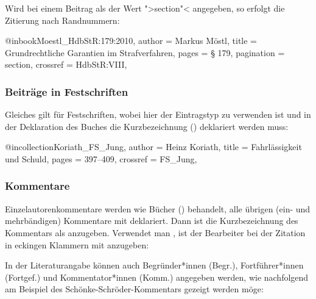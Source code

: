 \documentclass{ltxdockit}[2010/09/26]
\begin{document}
Wird bei einem Beitrag als  der Wert ">section"< angegeben, so erfolgt die Zitierung nach Randnummern:

\begin{ltxcode}
@inbook{Moestl_HdbStR:179:2010,
author = {Markus Möstl},
title = {Grundrechtliche Garantien im Strafverfahren},
pages = {§ 179},
pagination = {section},
crossref = {HdbStR:VIII},
}
\end{ltxcode}

\subsubsection{Beiträge in Festschriften}

Gleiches gilt für Festschriften, wobei hier der Eintragstyp  zu verwenden ist und in der Deklaration des Buches die Kurzbezeichnung () deklariert werden muss:

\begin{ltxcode}
@incollection{Koriath_FS_Jung,
author = {Heinz Koriath},
title = {Fahrlässigkeit und Schuld},
pages = {397--409},
crossref = {FS_Jung},
}
\end{ltxcode}

\subsubsection{Kommentare}

Einzelautorenkommentare werden wie Bücher () behandelt, alle übrigen (ein- und mehrbändigen) Kommentare mit  deklariert. Dann ist die Kurzbezeichnung des Kommentars als  anzugeben. Verwendet man , ist der Bearbeiter bei der Zitation in eckingen Klammern mit anzugeben:

\begin{ltxcode}
\cite[Lüderssen/Jahn][§\,140 Rn.~1]{LR26}
\end{ltxcode}

In der Literaturangabe können auch Begründer*innen (Begr.), Fortführer*innen (Fortgef.) und Kommentator*innen (Komm.) angegeben werden, wie nachfolgend am Beispiel des Schönke-Schröder-Kommentars gezeigt werden möge:
\end{document}
